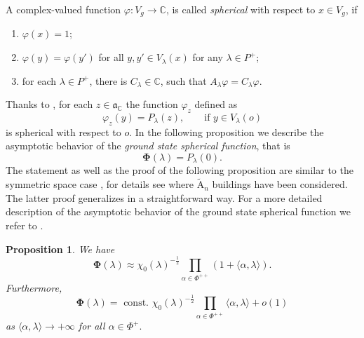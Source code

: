 \documentclass[11pt]{amsart}
\newcommand{\CC}{\mathbb{C}}
\newcommand{\vphi}{\varphi}
\theoremstyle{plain}
\newtheorem{proposition}[theorem]{Proposition}
\theoremstyle{definition}
\numberwithin{equation}{section}
\begin{document}
A complex-valued function $\vphi: V_g \rightarrow \CC$, is called \emph{spherical} with respect to $x \in V_g$, if
\begin{enumerate}
	\item $\vphi(x) = 1$;
	\item $\vphi(y) = \vphi(y')$ for all $y, y' \in V_\lambda(x)$ for any $\lambda \in P^+$;
	\item for each $\lambda \in P^+$, there is $C_\lambda \in \CC$, such that $A_\lambda \vphi = C_\lambda \vphi$.
\end{enumerate}
Thanks to \cite[Theorem 3.22]{park2}, for each $z \in \mathfrak{a}_{\CC}$ the function $\vphi_z$ defined as
\begin{equation}
	\label{eq:60}
	\vphi_z(y) = P_\lambda(z), \qquad\text{if } y \in V_\lambda(o)
\end{equation}
is spherical with respect to $o$. In the following proposition we describe the asymptotic behavior of the 
\emph{ground state spherical function}, that is
\begin{equation}
	\label{eq:51}
	\mathbf{\Phi}(\lambda) = P_\lambda(0).
\end{equation}
The statement as well as the proof of the following proposition are similar to the symmetric space case \cite{a1}, for details
see \cite[Proposition 2.1]{ascht} where $\tilde{\text{A}}_n$ buildings have been considered. The latter proof generalizes 
in a straightforward way. For a more detailed description of the asymptotic behavior of the ground state spherical function 
we refer to \cite[Section 7.2]{RemyTrojan}.
\begin{proposition} 
	\label{prop:1}
	We have
	\[
		\mathbf{\Phi}(\lambda)
		\approx \chi_0(\lambda)^{-\frac{1}{2}} \prod_{\alpha \in \Phi^{++}}(1+\langle\alpha, \lambda\rangle).
	\]
	Furthermore,
	\[
		\mathbf{\Phi}(\lambda)
		= \text{ const. } \chi_0(\lambda)^{-\frac{1}{2}}  
		\prod_{\alpha \in \Phi^{++}} \langle\alpha, \lambda\rangle + o(1)
	\]
	as $\langle\alpha, \lambda\rangle \rightarrow +\infty$  for all  $\alpha \in \Phi^{+}.$
\end{proposition}
\end{document}
